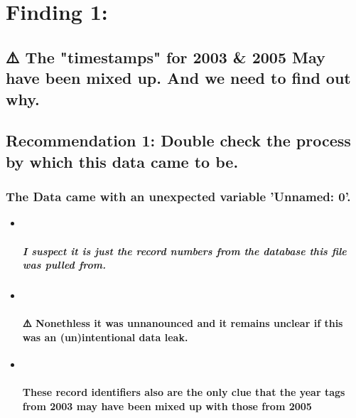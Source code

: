 \documentclass[11pt]{article}
\begin{document}
    \section{Finding 1:}\label{finding-1}

\subsection{⚠️ The "timestamps" for 2003 \& 2005 May have been mixed up.
And we need to find out
why.}\label{the-timestamps-for-2003-2005-may-have-been-mixed-up.-and-we-need-to-find-out-why.}

\subsection{Recommendation 1: Double check the process by which this
data came to
be.}\label{recommendation-1-double-check-the-process-by-which-this-data-came-to-be.}

\subsubsection{The Data came with an unexpected variable 'Unnamed:
0'.}\label{the-data-came-with-an-unexpected-variable-unnamed-0.}

\begin{itemize}
\item ~
  \subparagraph{I suspect it is just the record numbers from the
  database this file was pulled
  from.}\label{i-suspect-it-is-just-the-record-numbers-from-the-database-this-file-was-pulled-from.}
\item ~
  \paragraph{⚠️ Nonethless it was unnanounced and it remains unclear if
  this was an (un)intentional data
  leak.}\label{nonethless-it-was-unnanounced-and-it-remains-unclear-if-this-was-an-unintentional-data-leak.}
\item ~
  \paragraph{These record identifiers also are the only clue that the
  year tags from 2003 may have been mixed up with those from
  2005}\label{these-record-identifiers-also-are-the-only-clue-that-the-year-tags-from-2003-may-have-been-mixed-up-with-those-from-2005}
\end{itemize}
\end{document}
